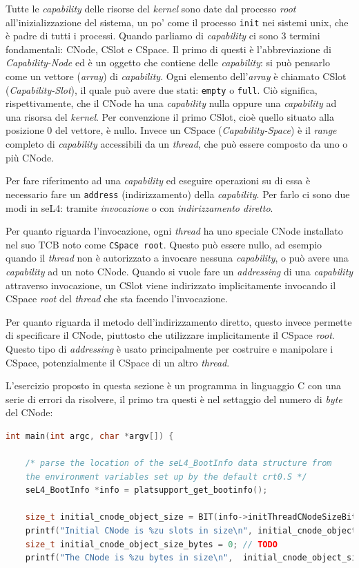 Tutte le \textit{capability} delle risorse del \textit{kernel} sono date dal processo \textit{root} all'inizializzazione del sistema, un po' come il processo \texttt{init} nei sistemi unix, che è padre di tutti i processi. Quando parliamo di \textit{capability} ci sono 3 termini fondamentali: CNode, CSlot e CSpace. Il primo di questi è l'abbreviazione di \textit{Capability-Node} ed è un oggetto che contiene delle \textit{capability}: si può pensarlo come un vettore (\textit{array}) di \textit{capability}. Ogni elemento dell'\textit{array} è chiamato CSlot (\textit{Capability-Slot}), il quale può avere due stati: \texttt{empty} o \texttt{full}. Ciò significa, rispettivamente, che il CNode ha una \textit{capability} nulla oppure una \textit{capability} ad una risorsa del \textit{kernel}. Per convenzione il primo CSlot, cioè quello situato alla posizione 0 del vettore, è nullo. Invece un CSpace (\textit{Capability-Space}) è il \textit{range} completo di \textit{capability} accessibili da un \textit{thread}, che può essere composto da uno o più CNode.

Per fare riferimento ad una \textit{capability} ed eseguire operazioni su di essa è necessario fare un \texttt{address} (indirizzamento) della \textit{capability}. Per farlo ci sono due modi in seL4: tramite \textit{invocazione} o con \textit{indirizzamento diretto}.

Per quanto riguarda l'invocazione, ogni \textit{thread} ha uno speciale CNode installato nel suo TCB noto come \texttt{CSpace root}. Questo può essere nullo, ad esempio quando il \textit{thread} non è autorizzato a invocare nessuna \textit{capability}, o può avere una \textit{capability} ad un noto CNode. Quando si vuole fare un \textit{addressing} di una \textit{capability} attraverso invocazione, un CSlot viene indirizzato implicitamente invocando il CSpace \textit{root} del \textit{thread} che sta facendo l'invocazione.

Per quanto riguarda il metodo dell'indirizzamento diretto, questo invece permette di specificare il CNode, piuttosto che utilizzare implicitamente il CSpace \textit{root}. Questo tipo di \textit{addressing}  è usato principalmente per costruire e manipolare i CSpace, potenzialmente il CSpace di un altro \textit{thread}.

L'esercizio proposto in questa sezione è un programma in linguaggio C con una serie di errori da risolvere, il primo tra questi è nel settaggio del numero di \textit{byte} del CNode:
\begin{lstlisting}[language=C++]
int main(int argc, char *argv[]) {

    /* parse the location of the seL4_BootInfo data structure from
    the environment variables set up by the default crt0.S */
    seL4_BootInfo *info = platsupport_get_bootinfo();

    size_t initial_cnode_object_size = BIT(info->initThreadCNodeSizeBits);
    printf("Initial CNode is %zu slots in size\n", initial_cnode_object_size);
    size_t initial_cnode_object_size_bytes = 0; // TODO
    printf("The CNode is %zu bytes in size\n", 	initial_cnode_object_size_bytes);
\end{lstlisting}

